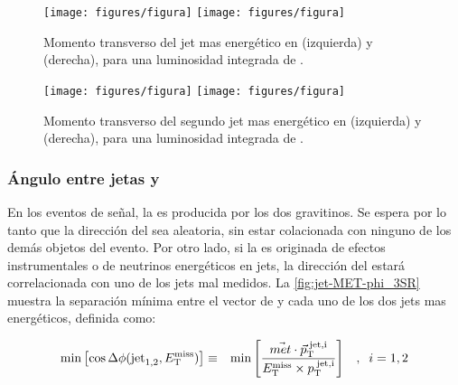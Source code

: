 
\begin{figure}[th!]
  \centering
  \texttt{[image: figures/figura]} %
  \texttt{[image: figures/figura]} %
  \caption{Momento transverso del jet mas energético en {\SRL} (izquierda) y {\SRH} (derecha),
    para una luminosidad integrada de {\ilumi}.}
  \label{fig:jetlead_3SR}
\end{figure}

\begin{figure}[th!]
 \centering
 \texttt{[image: figures/figura]} %
 \texttt{[image: figures/figura]} %
  \caption{Momento transverso del segundo jet mas energético en {\SRL} (izquierda) y {\SRH} (derecha),
    para una luminosidad integrada de {\ilumi}.}
 \label{fig:jetsublead_3SR}
\end{figure}

\subsubsection{Ángulo entre jetas y \etmiss}
\label{sec:dphi_obj}

En los eventos de señal, la {\met} es producida por los dos gravitinos.
Se espera por lo tanto que la dirección del {\met} sea aleatoria, sin
estar colacionada con ninguno de los demás objetos del evento.
Por otro lado, si la {\met} es originada de efectos instrumentales o de
neutrinos energéticos en jets, la dirección del {\met} estará correlacionada
con uno de los jets mal medidos. La \cref{fig:jet-MET-phi_3SR} muestra
la separación mínima entre el vector de {\met} y cada uno de los dos jets
mas energéticos, definida como:


\begin{eqnarray} \label{eq:dphi}
  \min\left[ \cos   \Delta\phi({\rm jet}_{1,2},E_{\mathrm{T}}^{\mathrm{miss}}) \right] &\equiv&  \min \left[\frac{\vec{met} \cdot \vec{p}_{\rm T}^{\rm \; jet,i}}{E_{\mathrm{T}}^{\mathrm{miss}} \times p_{\mathrm{T}}^{\rm \; jet,i}}\right] \; \;\; , \;\; i = 1,2
\end{eqnarray}
%

